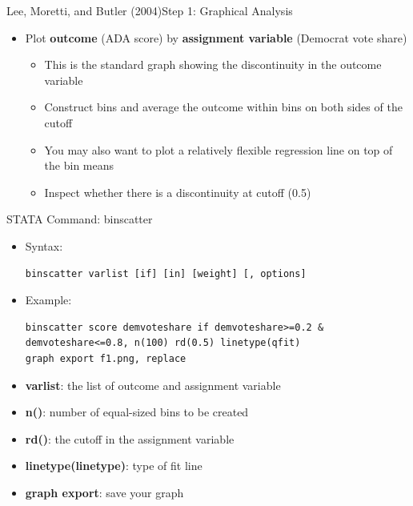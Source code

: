 \documentclass[dvipsnames,hyperref={pdfpagelabels=false}]{beamer}
\begin{document}
\begin{frame}{Lee, Moretti, and Butler (2004)}{Step 1: Graphical Analysis}
	\begin{itemize}
		\item Plot \textbf{outcome} (ADA score) by \textbf{assignment variable} (Democrat vote share)
		\vspace{0.2cm}
		\begin{itemize}
			\item This is the standard graph showing the discontinuity in the outcome
			variable
			\vspace{0.2cm}
			\item Construct bins and average the outcome within bins on both
			sides of the cutoff 
			\vspace{0.2cm}
			\item You may also want to plot a relatively flexible regression line
			on top of the bin means
			\vspace{0.2cm}
			\item Inspect whether there is a discontinuity at cutoff (0.5)
		\end{itemize}
	\end{itemize}
\end{frame}


\begin{frame}[fragile]{STATA Command: binscatter}
	\begin{itemize}
		\item Syntax:
\begin{lstlisting}
binscatter varlist [if] [in] [weight] [, options]
\end{lstlisting}
		
		\item Example:
\begin{lstlisting}
binscatter score demvoteshare if demvoteshare>=0.2 & demvoteshare<=0.8, n(100) rd(0.5) linetype(qfit) 
graph export f1.png, replace
\end{lstlisting}
		
		\vspace{0.2cm}
		\item  \textbf{varlist}: the list of outcome and assignment variable
		\vspace{0.2cm}
		\item \textbf{n()}: number of equal-sized bins to be created
		\vspace{0.2cm}
		\item \textbf{rd()}: the cutoff in the assignment variable
		\vspace{0.2cm}
		\item \textbf{linetype(linetype)}: type of fit line
		\vspace{0.2cm}
		\item \textbf{graph export}: save your graph
	\end{itemize}
\end{frame}
\end{document}
